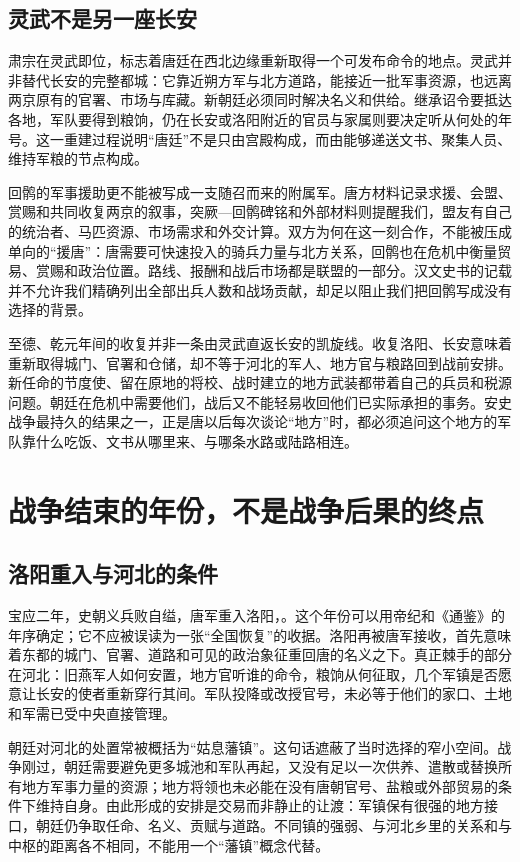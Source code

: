 \subsection{灵武不是另一座长安}
肃宗在灵武即位，标志着唐廷在西北边缘重新取得一个可发布命令的地点。灵武并非替代长安的完整都城：它靠近朔方军与北方道路，能接近一批军事资源，也远离两京原有的官署、市场与库藏。新朝廷必须同时解决名义和供给。继承诏令要抵达各地，军队要得到粮饷，仍在长安或洛阳附近的官员与家属则要决定听从何处的年号。这一重建过程说明“唐廷”不是只由宫殿构成，而由能够递送文书、聚集人员、维持军粮的节点构成。

回鹘的军事援助更不能被写成一支随召而来的附属军。唐方材料记录求援、会盟、赏赐和共同收复两京的叙事，突厥—回鹘碑铭和外部材料则提醒我们，盟友有自己的统治者、马匹资源、市场需求和外交计算。双方为何在这一刻合作，不能被压成单向的“援唐”：唐需要可快速投入的骑兵力量与北方关系，回鹘也在危机中衡量贸易、赏赐和政治位置。路线、报酬和战后市场都是联盟的一部分。汉文史书的记载并不允许我们精确列出全部出兵人数和战场贡献，却足以阻止我们把回鹘写成没有选择的背景。

至德、乾元年间的收复并非一条由灵武直返长安的凯旋线。收复洛阳、长安意味着重新取得城门、官署和仓储，却不等于河北的军人、地方官与粮路回到战前安排。新任命的节度使、留在原地的将校、战时建立的地方武装都带着自己的兵员和税源问题。朝廷在危机中需要他们，战后又不能轻易收回他们已实际承担的事务。安史战争最持久的结果之一，正是唐以后每次谈论“地方”时，都必须追问这个地方的军队靠什么吃饭、文书从哪里来、与哪条水路或陆路相连。

\section{战争结束的年份，不是战争后果的终点}

\subsection{洛阳重入与河北的条件}
宝应二年，史朝义兵败自缢，唐军重入洛阳，。这个年份可以用帝纪和《通鉴》的年序确定；它不应被误读为一张“全国恢复”的收据。洛阳再被唐军接收，首先意味着东都的城门、官署、道路和可见的政治象征重回唐的名义之下。真正棘手的部分在河北：旧燕军人如何安置，地方官听谁的命令，粮饷从何征取，几个军镇是否愿意让长安的使者重新穿行其间。军队投降或改授官号，未必等于他们的家口、土地和军需已受中央直接管理。

朝廷对河北的处置常被概括为“姑息藩镇”。这句话遮蔽了当时选择的窄小空间。战争刚过，朝廷需要避免更多城池和军队再起，又没有足以一次供养、遣散或替换所有地方军事力量的资源；地方将领也未必能在没有唐朝官号、盐粮或外部贸易的条件下维持自身。由此形成的安排是交易而非静止的让渡：军镇保有很强的地方接口，朝廷仍争取任命、名义、贡赋与道路。不同镇的强弱、与河北乡里的关系和与中枢的距离各不相同，不能用一个“藩镇”概念代替。

